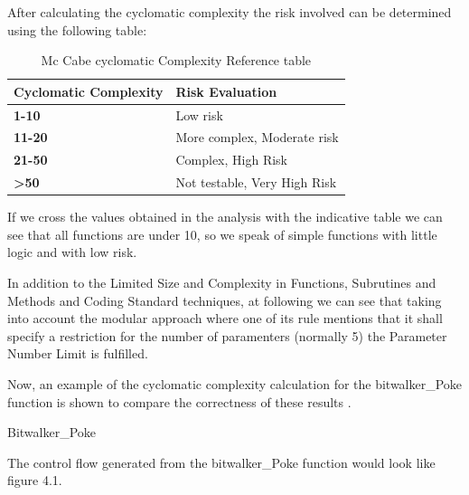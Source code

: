 After calculating the cyclomatic complexity the risk involved can be determined using the following table:

{\footnotesize\sffamily\centering
  \begin{longtable}{||p{}|p{}||}
  \caption{Mc Cabe cyclomatic Complexity Reference table}\\
    \hline\hline
    \textbf{Cyclomatic Complexity} & \textbf{Risk Evaluation} \\
    \hline\hline
    \endhead
    \hline\hline
    \endfoot
    \textbf{1-10}
& Low risk
    \\
    \hline
    \textbf{11-20}
& More complex, Moderate risk
    \\
    \hline
    \textbf{21-50}
& Complex, High Risk
    \\
    \hline
    \textbf{>50}
& Not testable, Very High Risk
    \\
    \hline
\end{longtable}}

If we cross the values ​​obtained in the analysis with the indicative table we can see that all functions are under 10, so we speak of simple functions with little logic and with low risk.

In addition to the Limited Size and Complexity in Functions, Subrutines and Methods and Coding Standard techniques, at following we can see that taking into account the modular approach where one of its rule mentions that it shall specify a restriction for the number of paramenters (normally 5) the Parameter Number Limit is fulfilled.

Now, an example of the cyclomatic complexity calculation for the bitwalker\_Poke function is shown to compare the correctness of these results .

\begin{listing}[hbt]
\begin{minipage}{\textwidth}

\end{minipage}
\caption{Bitwalker\_Poke}
\end{listing}

The control flow generated from the bitwalker\_Poke function would look like figure 4.1.

